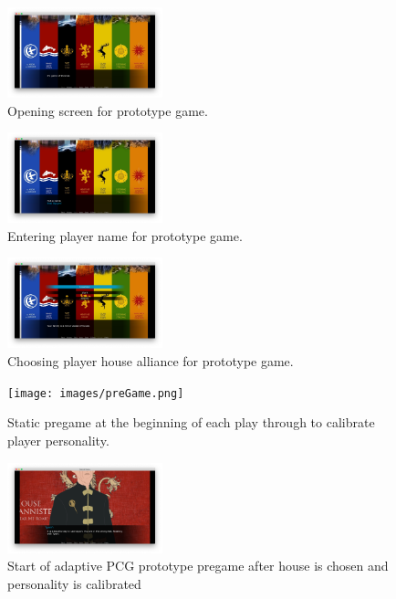 \begin{figure}[ht]
    \centering
    \includegraphics[width=0.4\textwidth]{images/gameStart.png}
    \caption{Opening screen for prototype game.}
    \label{fig:gameStart}
\end{figure}

\begin{figure}[ht]
    \centering
    \includegraphics[width=0.4\textwidth]{images/chooseName.png}
    \caption{Entering player name for prototype game.}
    \label{fig:chooseName}
\end{figure}

\begin{figure}[ht]
    \centering
    \includegraphics[width=0.4\textwidth]{images/chooseHouse.png}
    \caption{Choosing player house alliance for prototype game.}
    \label{fig:chooseHouse}
\end{figure}

\begin{figure}[ht]
    \centering
    \texttt{[image: images/preGame.png]}
    \caption{Static pregame at the beginning of each play through to calibrate player personality.}
    \label{fig:preGame}
\end{figure}

\begin{figure}[ht]
    \centering
    \includegraphics[width=0.4\textwidth]{images/customLannister.png}
    \caption{Start of adaptive PCG prototype pregame after house is chosen and personality is calibrated}
    \label{fig:customLannister}
\end{figure}